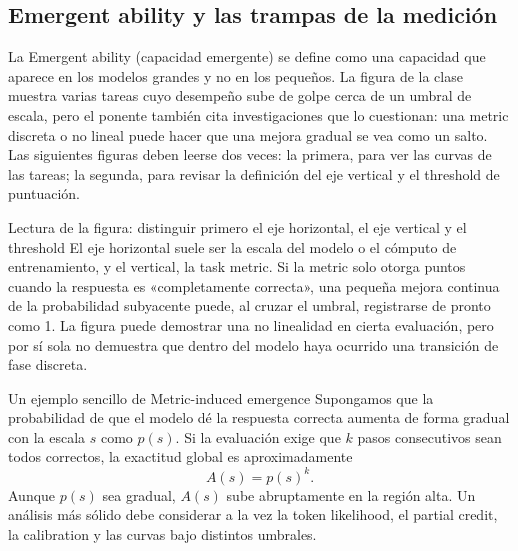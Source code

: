 \subsection{Emergent ability y las trampas de la medición}

La Emergent ability (capacidad emergente) se define como una capacidad que aparece en los modelos grandes y no en los pequeños. La figura de la clase muestra varias tareas cuyo desempeño sube de golpe cerca de un umbral de escala, pero el ponente también cita investigaciones que lo cuestionan: una metric discreta o no lineal puede hacer que una mejora gradual se vea como un salto. Las siguientes figuras deben leerse dos veces: la primera, para ver las curvas de las tareas; la segunda, para revisar la definición del eje vertical y el threshold de puntuación.


\begin{knowledgebox}{Lectura de la figura: distinguir primero el eje horizontal, el eje vertical y el threshold}
El eje horizontal suele ser la escala del modelo o el cómputo de entrenamiento, y el vertical, la task metric. Si la metric solo otorga puntos cuando la respuesta es «completamente correcta», una pequeña mejora continua de la probabilidad subyacente puede, al cruzar el umbral, registrarse de pronto como 1. La figura puede demostrar una no linealidad en cierta evaluación, pero por sí sola no demuestra que dentro del modelo haya ocurrido una transición de fase discreta.
\end{knowledgebox}


\begin{importantbox}{Un ejemplo sencillo de Metric-induced emergence}
Supongamos que la probabilidad de que el modelo dé la respuesta correcta aumenta de forma gradual con la escala $s$ como $p(s)$. Si la evaluación exige que $k$ pasos consecutivos sean todos correctos, la exactitud global es aproximadamente
\[
A(s)=p(s)^k.
\]
Aunque $p(s)$ sea gradual, $A(s)$ sube abruptamente en la región alta. Un análisis más sólido debe considerar a la vez la token likelihood, el partial credit, la calibration y las curvas bajo distintos umbrales.
\end{importantbox}

